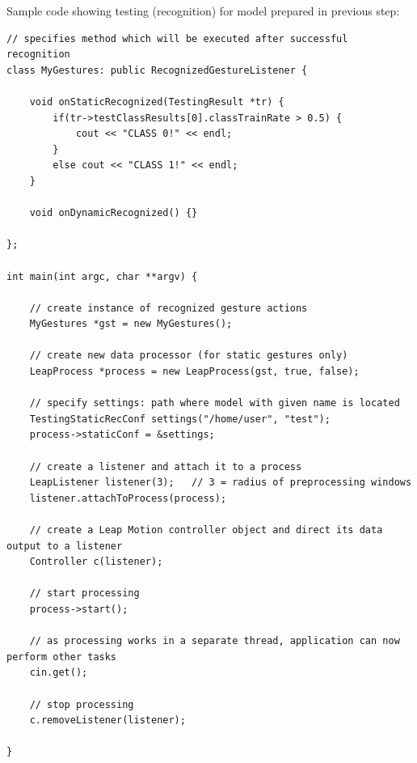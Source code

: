 Sample code showing testing (recognition) for model prepared in previous step:
\begin{lstlisting}
// specifies method which will be executed after successful recognition
class MyGestures: public RecognizedGestureListener {

	void onStaticRecognized(TestingResult *tr) {
		if(tr->testClassResults[0].classTrainRate > 0.5) {
			cout << "CLASS 0!" << endl;
		}
		else cout << "CLASS 1!" << endl;
	}

	void onDynamicRecognized() {}

};

int main(int argc, char **argv) {

	// create instance of recognized gesture actions
	MyGestures *gst = new MyGestures();

	// create new data processor (for static gestures only)
	LeapProcess *process = new LeapProcess(gst, true, false);

	// specify settings: path where model with given name is located
	TestingStaticRecConf settings("/home/user", "test");
	process->staticConf = &settings;
	
	// create a listener and attach it to a process
	LeapListener listener(3);	// 3 = radius of preprocessing windows
	listener.attachToProcess(process);
	
	// create a Leap Motion controller object and direct its data output to a listener
	Controller c(listener);

	// start processing
	process->start();
	
	// as processing works in a separate thread, application can now perform other tasks
	cin.get();
	
	// stop processing
	c.removeListener(listener);

}
\end{lstlisting}

